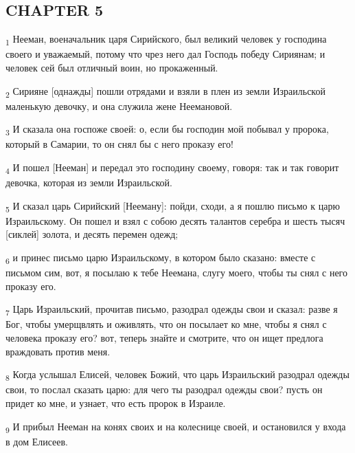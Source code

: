 \subsection{CHAPTER 5}
\begin{tcolorbox}
\textsubscript{1} Нееман, военачальник царя Сирийского, был великий человек у господина своего и уважаемый, потому что чрез него дал Господь победу Сириянам; и человек сей был отличный воин, но прокаженный.
\end{tcolorbox}
\begin{tcolorbox}
\textsubscript{2} Сирияне [однажды] пошли отрядами и взяли в плен из земли Израильской маленькую девочку, и она служила жене Неемановой.
\end{tcolorbox}
\begin{tcolorbox}
\textsubscript{3} И сказала она госпоже своей: о, если бы господин мой побывал у пророка, который в Самарии, то он снял бы с него проказу его!
\end{tcolorbox}
\begin{tcolorbox}
\textsubscript{4} И пошел [Нееман] и передал это господину своему, говоря: так и так говорит девочка, которая из земли Израильской.
\end{tcolorbox}
\begin{tcolorbox}
\textsubscript{5} И сказал царь Сирийский [Нееману]: пойди, сходи, а я пошлю письмо к царю Израильскому. Он пошел и взял с собою десять талантов серебра и шесть тысяч [сиклей] золота, и десять перемен одежд;
\end{tcolorbox}
\begin{tcolorbox}
\textsubscript{6} и принес письмо царю Израильскому, в котором было сказано: вместе с письмом сим, вот, я посылаю к тебе Неемана, слугу моего, чтобы ты снял с него проказу его.
\end{tcolorbox}
\begin{tcolorbox}
\textsubscript{7} Царь Израильский, прочитав письмо, разодрал одежды свои и сказал: разве я Бог, чтобы умерщвлять и оживлять, что он посылает ко мне, чтобы я снял с человека проказу его? вот, теперь знайте и смотрите, что он ищет предлога враждовать против меня.
\end{tcolorbox}
\begin{tcolorbox}
\textsubscript{8} Когда услышал Елисей, человек Божий, что царь Израильский разодрал одежды свои, то послал сказать царю: для чего ты разодрал одежды свои? пусть он придет ко мне, и узнает, что есть пророк в Израиле.
\end{tcolorbox}
\begin{tcolorbox}
\textsubscript{9} И прибыл Нееман на конях своих и на колеснице своей, и остановился у входа в дом Елисеев.
\end{tcolorbox}
